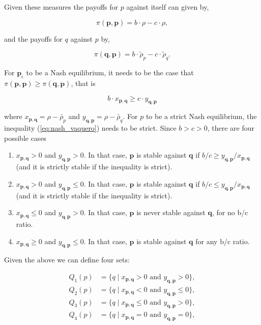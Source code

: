 \documentclass{article}
\theoremstyle{definition}
\begin{document}
Given these measures the payoffs for \(p\) against itself can given by,

\[\pi (\mathbf{p}, \mathbf{p}) = b \cdot \rho - c\cdot\rho,\]

and the payoffs for \(q\) against \(p\) by,

\[\pi(\mathbf{q}, \mathbf{p}) = b \cdot \tilde{\rho}_p - c\cdot\tilde{\rho}_q.\]

For \(\mathbf{p}_{\epsilon}\) to be a Nash equilibrium, it needs to be the case that \(\pi (\mathbf{p}, \mathbf{p}) \geq
\pi(\mathbf{q}, \mathbf{p})\), that is

\begin{equation}\label{eq:nash_vaquero}
  b \cdot x_{\mathbf{p}, \mathbf{q}} \geq c \cdot y_{\mathbf{q}, \mathbf{p}}
\end{equation}

where \(x_{\mathbf{p}, \mathbf{q}} = \rho - \tilde{\rho_p}\) and  \(y_{\mathbf{q}, \mathbf{p}} = \rho - \tilde{\rho_q}\).
For \(p\) to be a strict Nash equilibrium, the inequality (\ref{eq:nash_vaquero}) needs
to be strict. Since \(b > c > 0\), there are four possible cases

\begin{enumerate}
  \item \(x_{\mathbf{p}, \mathbf{q}} > 0 \) and \(y_{\mathbf{q}, \mathbf{p}} > 0\). In that case, \(\mathbf{p}\) is stable
  against \(\mathbf{q}\) if \(b/c \geq y_{\mathbf{q}, \mathbf{p}}/x_{\mathbf{p}, \mathbf{q}}\) (and it is strictly stable if the inequality is
  strict).
  \item \(x_{\mathbf{p}, \mathbf{q}} > 0 \) and \(y_{\mathbf{q}, \mathbf{p}} \leq 0\). In that case, \(\mathbf{p}\) is stable
  against \(\mathbf{q}\) if \(b/c \leq y_{\mathbf{q}, \mathbf{p}}/x_{\mathbf{p}, \mathbf{q}}\) (and it is strictly stable if the inequality is
  strict).
  \item \(x_{\mathbf{p}, \mathbf{q}} \leq 0 \) and \(y_{\mathbf{q}, \mathbf{p}} > 0\). In that case,
  \(\mathbf{p}\) is never stable against \(\mathbf{q}\), for no b/c ratio.
  \item  \(x_{\mathbf{p}, \mathbf{q}} \geq 0 \) and \(y_{\mathbf{q}, \mathbf{p}} \leq 0\). In that case, \(\mathbf{p}\) is stable against \(\mathbf{q}\) for any b/c ratio.
\end{enumerate}

Given the above we can define four sets:

\begin{align}
  Q_1(p) & = \{q \; | \; x_{\mathbf{p}, \mathbf{q}} > 0 \text{ and } y_{\mathbf{q}, \mathbf{p}} > 0 \}, \\
  Q_2(p) & = \{q \; | \; x_{\mathbf{p}, \mathbf{q}} < 0 \text{ and } y_{\mathbf{q}, \mathbf{p}} \leq 0 \}, \\
  Q_3(p) & = \{q \; | \; x_{\mathbf{p}, \mathbf{q}} \leq 0 \text{ and } y_{\mathbf{q}, \mathbf{p}} > 0\}, \\
  Q_4(p) & = \{q \; | \; x_{\mathbf{p}, \mathbf{q}} = 0  \text{ and } y_{\mathbf{q}, \mathbf{p}} = 0 \}, \\
\end{align}
\end{document}
